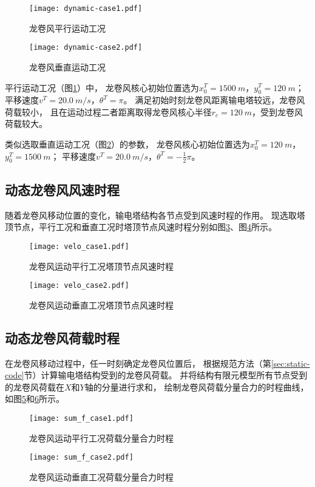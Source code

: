 \begin{figure}[!htpb]
    \centering
    \texttt{[image: dynamic-case1.pdf]}
    \caption{龙卷风平行运动工况}
    \label{fig:dynamic-case1}
\end{figure}
\begin{figure}[!htpb]
    \centering
    \texttt{[image: dynamic-case2.pdf]}
    \caption{龙卷风垂直运动工况}
    \label{fig:dynamic-case2}
\end{figure}

平行运动工况（图\ref{fig:dynamic-case1}）中，
龙卷风核心初始位置选为$x_0^T=\SI{1500}{m}$，$y_0^T=\SI{120}{m}$；
平移速度$v^T=\SI{20.0}{m/s}$，$\theta^T=\pi$。
满足初始时刻龙卷风距离输电塔较远，龙卷风荷载较小，
且在运动过程二者距离取得龙卷风核心半径$r_c=\SI{120}{m}$，受到龙卷风荷载较大。

类似选取垂直运动工况（图\ref{fig:dynamic-case2}）的参数，
龙卷风核心初始位置选为$x_0^T=\SI{120}{m}$，$y_0^T=\SI{1500}{m}$；
平移速度$v^T=\SI{20.0}{m/s}$，$\theta^T=-\frac{1}{2}\pi$。

\subsection{动态龙卷风风速时程}

随着龙卷风移动位置的变化，输电塔结构各节点受到风速时程的作用。
现选取塔顶节点，平行工况和垂直工况时塔顶节点风速时程分别如图\ref{fig:velo_case1}、图\ref{fig:velo_case2}所示。
\begin{figure}[!htpb]
    \centering
    \texttt{[image: velo\_case1.pdf]}
    \caption{龙卷风运动平行工况塔顶节点风速时程}
    \label{fig:velo_case1}
\end{figure}
\begin{figure}[!htpb]
    \centering
    \texttt{[image: velo\_case2.pdf]}
    \caption{龙卷风运动垂直工况塔顶节点风速时程}
    \label{fig:velo_case2}
\end{figure}

\subsection{动态龙卷风荷载时程}

在龙卷风移动过程中，任一时刻确定龙卷风位置后，
根据规范方法（第\ref{sec:static-code}节）计算输电塔结构受到的龙卷风荷载。
并将结构有限元模型所有节点受到的龙卷风荷载在$X$和$Y$轴的分量进行求和，
绘制龙卷风荷载分量合力的时程曲线，如图\ref{fig:sum_f_case1}和\ref{fig:sum_f_case2}所示。
\begin{figure}[!htpb]
    \centering
    \texttt{[image: sum\_f\_case1.pdf]}
    \caption{龙卷风运动平行工况荷载分量合力时程}
    \label{fig:sum_f_case1}
\end{figure}
\begin{figure}[!htpb]
    \centering
    \texttt{[image: sum\_f\_case2.pdf]}
    \caption{龙卷风运动垂直工况荷载分量合力时程}
    \label{fig:sum_f_case2}
\end{figure}


